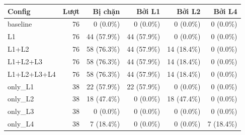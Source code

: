 \begin{tabular}{lrrrrr}
\toprule
Config & Lượt & Bị chặn & Bởi L1 & Bởi L2 & Bởi L4 \\
\midrule
baseline & 76 & 0 (0.0\%) & 0 (0.0\%) & 0 (0.0\%) & 0 (0.0\%) \\
L1 & 76 & 44 (57.9\%) & 44 (57.9\%) & 0 (0.0\%) & 0 (0.0\%) \\
L1+L2 & 76 & 58 (76.3\%) & 44 (57.9\%) & 14 (18.4\%) & 0 (0.0\%) \\
L1+L2+L3 & 76 & 58 (76.3\%) & 44 (57.9\%) & 14 (18.4\%) & 0 (0.0\%) \\
L1+L2+L3+L4 & 76 & 58 (76.3\%) & 44 (57.9\%) & 14 (18.4\%) & 0 (0.0\%) \\
only\_L1 & 38 & 22 (57.9\%) & 22 (57.9\%) & 0 (0.0\%) & 0 (0.0\%) \\
only\_L2 & 38 & 18 (47.4\%) & 0 (0.0\%) & 18 (47.4\%) & 0 (0.0\%) \\
only\_L3 & 38 & 0 (0.0\%) & 0 (0.0\%) & 0 (0.0\%) & 0 (0.0\%) \\
only\_L4 & 38 & 7 (18.4\%) & 0 (0.0\%) & 0 (0.0\%) & 7 (18.4\%) \\
\bottomrule
\end{tabular}
